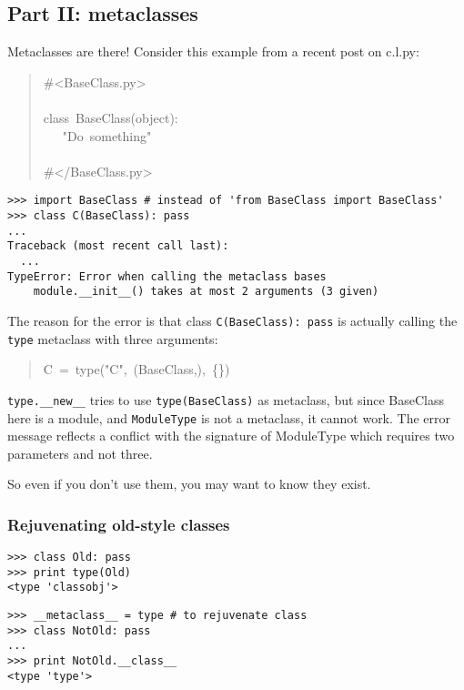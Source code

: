 \documentclass[10pt,a4paper,english]{article}
\begin{document}
\subsection*{Part II: metaclasses}

Metaclasses are there! Consider this example from a recent post on c.l.py:
\begin{quote}{\ttfamily \raggedright \noindent
{\#}<BaseClass.py>~\\
~\\
class~BaseClass(object):~\\
~~~"Do~something"~\\
~\\
{\#}</BaseClass.py>
}\end{quote}
\begin{verbatim}>>> import BaseClass # instead of 'from BaseClass import BaseClass'
>>> class C(BaseClass): pass
...
Traceback (most recent call last):
  ...
TypeError: Error when calling the metaclass bases
    module.__init__() takes at most 2 arguments (3 given)\end{verbatim}

The reason for the error is that class \texttt{C(BaseClass): pass} is
actually calling the \texttt{type} metaclass with three arguments:
\begin{quote}{\ttfamily \raggedright \noindent
C~=~type("C",~(BaseClass,),~{\{}{\}})
}\end{quote}

\texttt{type.{\_}{\_}new{\_}{\_}} tries to use \texttt{type(BaseClass)} as metaclass,
but since BaseClass here is a module,  and \texttt{ModuleType} is not
a metaclass, it cannot work. The error message reflects a conflict with 
the signature of ModuleType which requires two parameters and not three.

So even if you don't use them, you may want to know they exist.



\hypertarget{rejuvenating-old-style-classes}{}
\subsubsection*{Rejuvenating old-style classes}
\begin{verbatim}>>> class Old: pass
>>> print type(Old)
<type 'classobj'>\end{verbatim}
\begin{verbatim}>>> __metaclass__ = type # to rejuvenate class
>>> class NotOld: pass
...
>>> print NotOld.__class__
<type 'type'>\end{verbatim}
\end{document}
